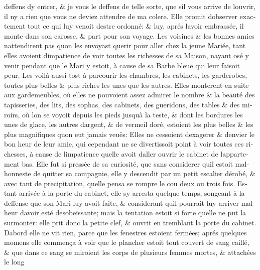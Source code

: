 \documentclass[14pt,a4paper]{memoir}
\begin{document}
\begin{otherlanguage}{french}
deffens d\textquotesingle y entrer, \& je vous le deffens de telle
sorte, que s\textquotesingle il vous arrive de l\textquotesingle ouvrir,
il n\textquotesingle y a rien que vous ne deviez attendre de ma colere.
Elle promit d\textquotesingle observer exactement tout ce qui luy venoit
d\textquotesingle estre ordonné: \& luy, aprés l\textquotesingle avoir
embrassée, il monte dans son carosse, \& part pour son voyage. Les
voisines \& les bonnes amies n\textquotesingle attendirent pas
qu\textquotesingle on les envoyast querir pour aller chez la jeune
Mariée, tant elles avoient d\textquotesingle impatience de voir toutes
les richesses de sa Maison, n\textquotesingle ayant osé y venir pendant
que le Mari y estoit, à cause de sa Barbe bleuë qui leur faisoit peur.
Les voilà aussi-tost à parcourir les chambres, les cabinets, les
garderobes, toutes plus belles \& plus riches les unes que les autres.
Elles monterent en suite aux gardemeubles, où elles ne pouvoient assez
admirer le nombre \& la beauté des tapisseries, des lits, des sophas,
des cabinets, des gueridons, des tables \& des miroirs, où
l\textquotesingle on se voyoit depuis les pieds jusqu\textquotesingle à
la teste, \& dont les bordures les unes de glace, les autres
d\textquotesingle argent, \& de vermeil doré, estoient les plus belles
\& les plus magnifiques qu\textquotesingle on eut jamais veuës: Elles ne
cessoient d\textquotesingle exagerer \& d\textquotesingle envier le bon
heur de leur amie, qui cependant ne se divertissoit point à voir toutes
ces richesses, à cause de l\textquotesingle impatience
qu\textquotesingle elle avoit d\textquotesingle aller ouvrir le cabinet
de l\textquotesingle appartement bas. Elle fut si pressée de sa
curiosité, que sans considerer qu\textquotesingle il estoit malhonneste
de quitter sa compagnie, elle y descendit par un petit escalier dérobé,
\& avec tant de precipitation, qu\textquotesingle elle pensa se rompre
le cou deux ou trois fois. Estant arrivée à la porte du cabinet, elle
s\textquotesingle y arresta quelque temps, songeant à la deffense que
son Mari luy avoit faite, \& considerant qu\textquotesingle il pourrait
luy arriver malheur d\textquotesingle avoir esté desobeïssante; mais la
tentation estoit si forte qu\textquotesingle elle ne put la surmonter:
elle prit donc la petite clef, \& ouvrit en tremblant la porte du
cabinet. D\textquotesingle abord elle ne vit rien, parce que les
fenestres estoient fermées; aprés quelques momens elle commença à voir
que le plancher estoit tout couvert de sang caillé, \& que dans ce sang
se miroient les corps de plusieurs femmes mortes, \& attachées le long

\end{otherlanguage}
\end{document}
